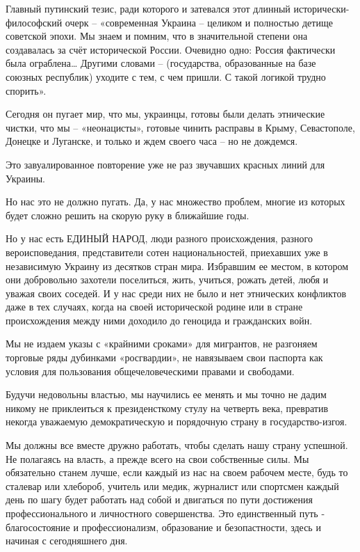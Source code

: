 Главный путинский тезис, ради которого и затевался этот длинный
исторически-философский очерк – «современная Украина – целиком и полностью
детище советской эпохи. Мы знаем и помним, что в значительной степени она
создавалась за счёт исторической России. Очевидно одно: Россия фактически была
ограблена… Другими словами – (государства, образованные на базе союзных
республик) уходите с тем, с чем пришли. С такой логикой трудно спорить».

Сегодня он пугает мир, что мы, украинцы, готовы были делать этнические чистки,
что мы –  «неонацисты», готовые чинить расправы в Крыму, Севастополе, Донецке и
Луганске, и только и ждем своего часа – но не дождемся.

Это завуалированное повторение уже не раз звучавших красных линий для Украины.

Но нас это не должно пугать. Да, у нас множество проблем, многие из которых
будет сложно решить на скорую руку в ближайшие годы.

Но у нас есть ЕДИНЫЙ НАРОД, люди разного происхождения, разного
вероисповедания, представители сотен национальностей, приехавших уже в
независимую Украину из десятков стран мира. Избравшим ее местом, в котором они
добровольно захотели поселиться, жить, учиться, рожать детей, любя и уважая
своих соседей. И у нас среди них не было и нет этнических конфликтов даже в тех
случаях, когда на своей исторической родине или в стране происхождения между
ними доходило до геноцида и гражданских войн.

Мы не издаем указы с «крайними сроками» для мигрантов, не разгоняем торговые
ряды дубинками «росгвардии», не навязываем свои паспорта как условия для
пользования общечеловеческими правами и свободами.

Будучи недовольны властью, мы научились ее менять и мы точно не дадим никому не
приклеиться к президенсткому стулу на четверть века, превратив некогда
уважаемую демократическую и порядочную страну в государство-изгоя.

Мы должны все вместе дружно работать, чтобы сделать нашу страну успешной. Не
полагаясь на власть, а прежде всего на свои собственные силы. Мы обязательно
станем лучше, если каждый из нас на своем рабочем месте, будь то сталевар или
хлебороб, учитель или медик, журналист или спортсмен каждый день по шагу будет
работать над собой и двигаться по пути достижения профессионального и
личностного совершенства. Это единственный путь - благосостояние и
профессионализм, образование и безопастности, здесь и начиная с сегодняшнего
дня. 

